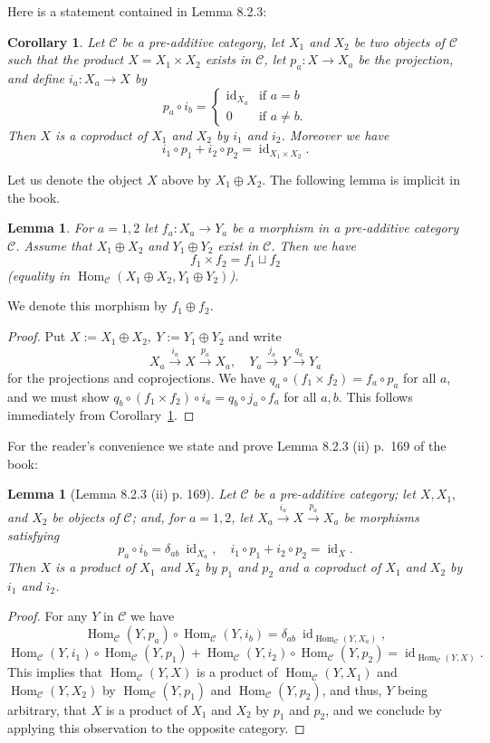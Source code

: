 \documentclass[12pt]{article}
\newtheorem{lem}[thm]{Lemma}
\newtheorem{cor}[thm]{Corollary}
\theoremstyle{remark}
\theoremstyle{definition}
\newcommand{\C}{\mathcal C}
\newcommand{\xr}{\xrightarrow}
\DeclareMathOperator{\id}{id}
\DeclareMathOperator{\Hom}{Hom}
\begin{document}
Here is a statement contained in Lemma 8.2.3:

\begin{cor}\label{823}
Let $\C$ be a pre-additive category, let $X_1$ and $X_2$ be two objects of $\C$ such that the product $X=X_1\times X_2$ exists in $\C$, let $p_a:X\to X_a$ be the projection, and define $i_a:X_a\to X$ by 
$$
p_a\circ i_b=\begin{cases}\id_{X_a}&\text{if }a=b\\0&\text{if }a\not=b.\end{cases}
$$ 
Then $X$ is a coproduct of $X_1$ and $X_2$ by $i_1$ and $i_2$. Moreover we have 
$$
i_1\circ p_1+i_2\circ p_2=\id_{X_1\times X_2}.
$$
\end{cor}

Let us denote the object $X$ above by $X_1\oplus X_2$. The following lemma is implicit in the book. 

\begin{lem}
For $a=1,2$ let $f_a:X_a\to Y_a$ be a morphism in a pre-additive category $\C$. Assume that $X_1\oplus X_2$ and $Y_1\oplus Y_2$ exist in $\C$. Then we have 
$$
f_1\times f_2=f_1\sqcup f_2
$$ 
(equality in $\Hom_\C(X_1\oplus X_2,Y_1\oplus Y_2)$). 
\end{lem} 

We denote this morphism by $f_1\oplus f_2$.\medskip 

\begin{proof}
Put $X:=X_1\oplus X_2,\ Y:=Y_1\oplus Y_2$ and write 
$$
X_a\xr{i_a}X\xr{p_a}X_a,\quad Y_a\xr{j_a}Y\xr{q_a}Y_a
$$ 
for the projections and coprojections. We have $q_a\circ(f_1\times f_2)=f_a\circ p_a$ for all $a$, and we must show $q_b\circ (f_1\times f_2)\circ i_a=q_b\circ j_a\circ f_a$ for all $a,b$. This follows immediately from Corollary~\ref{823}.
\end{proof}

For the reader's convenience we state and prove Lemma 8.2.3 (ii) p.~169 of the book:

\begin{lem}[Lemma 8.2.3 (ii) p. 169]\label{823ii}
Let $\C$ be a pre-additive category; let $X,X_1,$ and $X_2$ be objects of $\C$; and, for $a=1,2$, let $X_a\xr{i_a}X\xr{p_a}X_a$ be morphisms satisfying 
$$
p_a\circ i_b=\delta_{ab}\ \id_{X_a},\quad i_1\circ p_1+i_2\circ p_2=\id_X.
$$
Then $X$ is a product of $X_1$ and $X_2$ by $p_1$ and $p_2$ and a coproduct of $X_1$ and $X_2$ by $i_1$ and $i_2$. 
\end{lem}

\begin{proof}
For any $Y$ in $\C$ we have 
$$
\Hom_\C(Y,p_a)\circ\Hom_\C(Y,i_b)=\delta_{ab}\ \id_{\Hom_\C(Y,X_a)},
$$ 
$$
\Hom_\C(Y,i_1)\circ\Hom_\C(Y,p_1)+\Hom_\C(Y,i_2)\circ\Hom_\C(Y,p_2)=\id_{\Hom_\C(Y,X)}.
$$ 
This implies that $\Hom_\C(Y,X)$ is a product of $\Hom_\C(Y,X_1)$ and $\Hom_\C(Y,X_2)$ by $\Hom_\C(Y,p_1)$ and $\Hom_\C(Y,p_2)$, and thus, $Y$ being arbitrary, that $X$ is a product of $X_1$ and $X_2$ by $p_1$ and $p_2$, and we conclude by applying this observation to the opposite category.
\end{proof}
\end{document}

